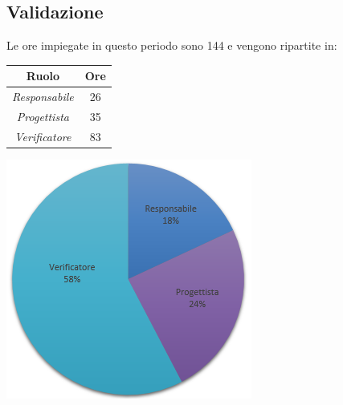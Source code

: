 \subsection{Validazione}
Le ore impiegate in questo periodo sono 144 e vengono ripartite in:
\begin{center}
  \centering
  \begin{tabular}{|c|c|}
    \hline
    \textbf{Ruolo} & \textbf{Ore} \\
    \hline
     \emph{Responsabile}  & 26 \\
    \hline  \emph{Progettista}  & 35 \\
    \hline  \emph{Verificatore}  & 83 \\
    \hline
  \end{tabular}
  \includegraphics[scale=0.7]{img/grafico6.png}
\end{center}

